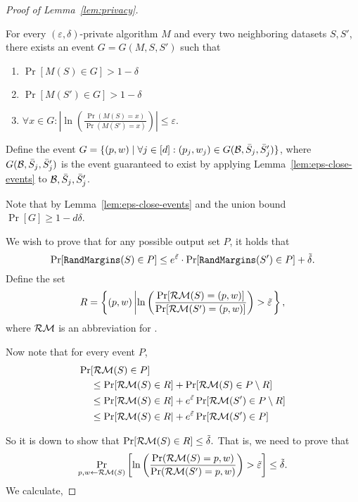 \documentclass[12pt,a4paper,oneside,onecolumn]{book}
\begin{document}
\begin{proof}[Proof of Lemma~\ref{lem:privacy}]
\begin{lemma}
  \label{lem:eps-close-events}
  For every $(\varepsilon, \delta)$-private  algorithm $M$ and every two neighboring datasets $S,S'$, there exists an event $G=G(M,S,S')$ such that 
  \begin{enumerate}[label=\roman*),itemjoin={,\quad}]
  \item $\Pr[M(S)\in G] > 1-\delta$
  \item  $\Pr[M(S')\in G] > 1-\delta$
  \item   $\forall x\in G :
    \left|\ln\left(\frac{\Pr(M(S)=x)}{\Pr(M(S')=x)}\right)\right| \leq \varepsilon$.
  \end{enumerate}
\end{lemma}
Define the event 
$
  G = \{(p,w)
  \mid \forall j\in [d]: (p_j,w_j) \in G(\mathcal{B},\bar{S}_j,\bar{S}_j')\}
$, 
where $G(\mathcal{B},\bar{S}_j,\bar{S}_j')$ is the event guaranteed to exist
by applying Lemma~\ref{lem:eps-close-events} to $\mathcal{B},\bar{S}_j,\bar{S}_j'$.


Note that by Lemma~\ref{lem:eps-close-events} and the union bound
$\Pr[G] \geq 1 - d\delta$.

We wish to prove that for any possible output set $P$, it holds that
$$\Pr[\texttt{RandMargins}(S)\in P] \leq e^{\tilde{\varepsilon}}\cdot\Pr[\texttt{RandMargins}(S')\in P] + \tilde{\delta}.$$ 
Define the set
\[
R = \left\{ (p,w) \left|     
    \ln\left(
    \frac{\Pr[\mathcal{RM}(S)=(p,w)]}{\Pr[\mathcal{RM}(S')=(p,w)]}\right) 
    > \tilde{\varepsilon} \right. \right\},
\]
    where $\mathcal{RM}$ is an abbreviation for .
    
Now note that for every event $P$,
\begin{align*}
    \Pr&[\mathcal{RM}(S) \in P] \\
    &\leq \Pr[\mathcal{RM}(S) \in R] + \Pr[\mathcal{RM}(S) \in P\setminus R]\\ 
    &\leq \Pr[\mathcal{RM}(S) \in R] + e^{\tilde{\varepsilon}} \Pr[\mathcal{RM}(S') \in P\setminus R] \\
    &\leq \Pr[\mathcal{RM}(S) \in R| + e^{\tilde{\varepsilon}} \Pr[\mathcal{RM}(S') \in P]
    \end{align*}
    
So it is down to show that 
$
\Pr[\mathcal{RM}(S) \in R] \leq \tilde{\delta}.
$ 
That is, we need to prove that
$$
  \Pr_{p,w \leftarrow \mathcal{RM}(S)}\left[\ln\left(\frac{\Pr(\mathcal{RM}(S)=p,w)}{\Pr(\mathcal{RM}(S')=p,w)}\right)
    > \tilde{\varepsilon} \right]\leq \tilde{\delta}.
$$ 
We calculate,





\end{proof}
\end{document}

